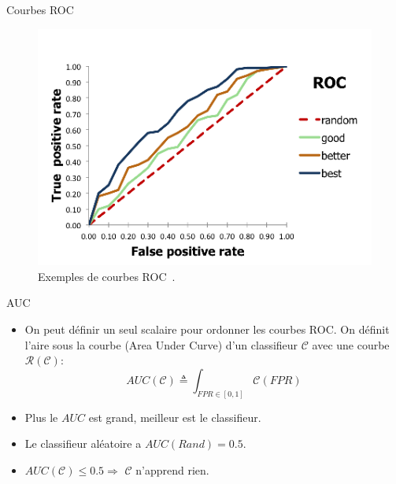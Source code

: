 \documentclass[8pt]{beamer}
\begin{document}
			\begin{frame}{Courbes ROC}
				\begin{figure}[H]
					\includegraphics[width=.6\textwidth]{images/samples/roc_curves.png}
					\caption*{Exemples de courbes ROC~\cite{ROCS}.}
				\end{figure}
			\end{frame}
			\begin{frame}{AUC}
				\begin{itemize}
					\item<1-> On peut définir un seul scalaire pour ordonner les courbes ROC. On définit l'aire sous la courbe (Area Under Curve) d'un classifieur \(\mathscr{C}\) avec une courbe \(\mathscr{R}(\mathscr{C})\):
					\begin{equation}
						AUC(\mathscr{C}) \triangleq \int_{FPR\in[0,1]} \mathscr{C}(FPR)
					\end{equation}
					\item<2-> Plus le \(AUC\) est grand, meilleur est le classifieur.
					\item<3-> Le classifieur aléatoire a \(AUC(Rand) = 0.5\).
					\item<4->\(AUC(\mathscr{C}) \leq 0.5 \Longrightarrow\) \(\mathscr{C}\) n'apprend rien.
				\end{itemize}
			\end{frame}
\end{document}

